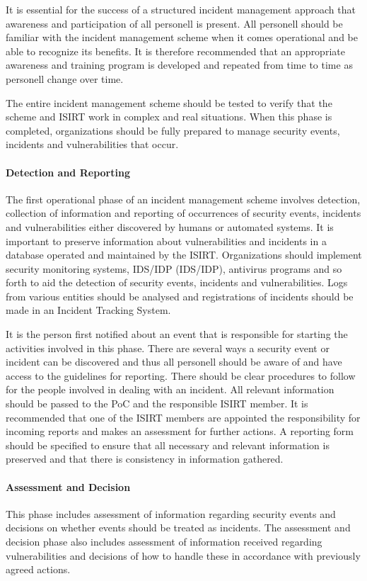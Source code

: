 It is essential for the success of a structured incident management approach that awareness and participation of all personell is present. All personell should be familiar with the incident management scheme when it comes operational and be able to recognize its benefits. It is therefore recommended that an appropriate awareness and training program is developed and repeated from time to time as personell change over time.

The entire incident management scheme should be tested to verify that the scheme and \ac{ISIRT} work in complex and real situations. When this phase is completed, organizations should be fully prepared to manage security events, incidents and vulnerabilities that occur.

\paragraph{Detection and Reporting} The first operational phase of an incident management scheme involves detection, collection of information and reporting of occurrences of security events, incidents and vulnerabilities either discovered by humans or automated systems. It is important to preserve information about vulnerabilities and incidents in a database operated and maintained by the \ac{ISIRT}. Organizations should implement security monitoring systems, \acl{IDS}/\acl{IDP} (\acs{IDS}/\acs{IDP}), antivirus programs and so forth to aid the detection of security events, incidents and vulnerabilities. Logs from various entities should be analysed and registrations of incidents should be made in an Incident Tracking System. 

It is the person first notified about an event that is responsible for starting the activities involved in this phase. There are several ways a security event or incident can be discovered and thus all personell should be aware of and have access to the guidelines for reporting. There should be clear procedures to follow for the people involved in dealing with an incident. All relevant information should be passed to the PoC and the responsible \ac{ISIRT} member. It is recommended that one of the \ac{ISIRT} members are appointed the responsibility for incoming reports and makes an assessment for further actions.  A reporting form should be specified to ensure that all necessary and relevant information is preserved and that there is consistency in information gathered. 

\paragraph{Assessment and Decision} This phase includes assessment of information regarding security events and decisions on whether events should be treated as incidents. The assessment and decision phase also includes assessment of information received regarding vulnerabilities and decisions of how to handle these in accordance with previously agreed actions.

